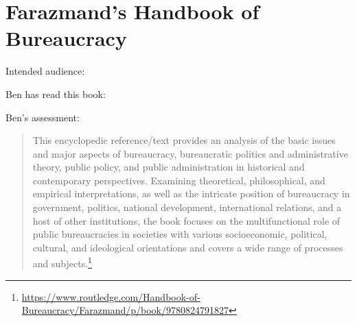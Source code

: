 \section{Farazmand's Handbook of Bureaucracy}

\cite{1994_Farazmand}

Intended audience:

Ben has read this book: 

Ben's assessment: 


\begin{quote}
    This encyclopedic reference/text provides an analysis of the basic issues and major aspects of bureaucracy, bureaucratic politics and administrative theory, public policy, and public administration in historical and contemporary perspectives. Examining theoretical, philosophical, and empirical interpretations, as well as the intricate position of bureaucracy in government, politics, national development, international relations, and a host of other institutions, the book focuses on the multifunctional role of public bureaucracies in societies with various socioeconomic, political, cultural, and ideological orientations and covers a wide range of processes and subjects.\footnote{\href{https://www.routledge.com/Handbook-of-Bureaucracy/Farazmand/p/book/9780824791827}{https://www.routledge.com/Handbook-of-Bureaucracy/Farazmand/p/book/9780824791827}}
\end{quote}
